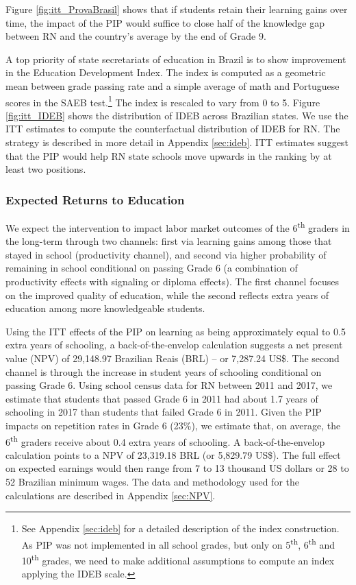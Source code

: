 \documentclass[11pt,a4paper]{article}
\begin{document}
Figure \ref{fig:itt_ProvaBrasil} shows that if students retain their learning gains over time, the impact of the PIP would suffice to close half of the knowledge gap between RN and the country's average by the end of Grade 9. 

A top priority of state secretariats of education in Brazil is to show improvement in the Education Development Index. The index is computed as a geometric mean between grade passing rate and a simple average of math and Portuguese scores in the SAEB test.\footnote{See Appendix \ref{sec:ideb} for a detailed description of the index construction. As PIP was not implemented in all school grades, but only on 5\textsuperscript{th}, 6\textsuperscript{th} and 10\textsuperscript{th} grades, we need to make additional assumptions to compute an index applying the IDEB scale.} The index is rescaled to vary from 0 to 5. Figure \ref{fig:itt_IDEB} shows the distribution of IDEB across Brazilian states. We use the ITT estimates to compute the counterfactual distribution of IDEB for RN. The strategy is described in more detail in Appendix \ref{sec:ideb}. ITT estimates suggest that the PIP would help RN state schools move upwards in the ranking by at least two positions.

\subsubsection*{Expected Returns to Education} 

We expect the intervention to impact labor market outcomes of the 6\textsuperscript{th} graders in the long-term through two channels: first via learning gains among those that stayed in school (productivity channel), and second via higher probability of remaining in school conditional on passing Grade 6 (a combination of productivity effects with signaling or diploma effects). The first channel focuses on the improved quality of education, while the second reflects extra years of education among more knowledgeable students.

Using the ITT effects of the PIP on learning as being approximately equal to 0.5 extra years of schooling, a back-of-the-envelop calculation suggests a net present value (NPV) of 29,148.97 Brazilian Reais (BRL) -- or 7,287.24 US\$. The second channel is through the increase in student years of schooling conditional on passing Grade 6. Using school census data for RN between 2011 and 2017, we estimate that students that passed Grade 6 in 2011 had about 1.7 years of schooling in 2017 than students that failed Grade 6 in 2011. Given the PIP impacts on repetition rates in Grade 6 (23\%), we estimate that, on average, the 6\textsuperscript{th} graders receive about 0.4 extra years of schooling. A back-of-the-envelop calculation points to a NPV of 23,319.18 BRL (or 5,829.79 US\$). The full effect on expected earnings would then range from 7 to 13 thousand US dollars or 28 to 52 Brazilian minimum wages. The data and methodology used for the calculations are described in Appendix \ref{sec:NPV}. 
\end{document}
